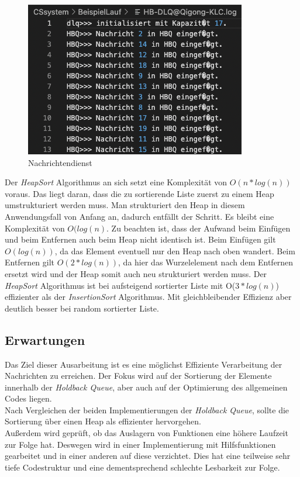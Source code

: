 \begin{figure}[htbp]
\begin{center}
\includegraphics[scale=0.6]{Bilder/HBQFilesEntry.png}
\caption{\label{fig:HBQFilesEntry2} Nachrichtendienst \cite{HBQlogging}} 
\end{center}
\end{figure}

Der \textit{HeapSort} Algorithmus an sich setzt eine Komplexität von $O(n*log(n))$ voraus. Das liegt daran, dass die zu sortierende Liste zuerst zu einem Heap umstrukturiert werden muss. Man strukturiert den Heap in diesem Anwendungsfall von Anfang an, dadurch entfällt der Schritt. Es bleibt eine Komplexität von $O(log(n)$. Zu beachten ist, dass der Aufwand beim Einfügen und beim Entfernen auch beim Heap nicht identisch ist. Beim Einfügen gilt $O(log(n))$, da das Element eventuell nur den Heap nach oben wandert. Beim Entfernen gilt $O(2*log(n))$, da hier das Wurzelelement nach dem Entfernen ersetzt wird und der Heap somit auch neu strukturiert werden muss. Der \textit{HeapSort} Algorithmus ist bei aufsteigend sortierter Liste mit O($3*log(n)$) effizienter als der \textit{InsertionSort} Algorithmus. Mit gleichbleibender Effizienz aber deutlich besser bei random sortierter Liste. 

\subsection{Erwartungen} \label{erwartungen}

Das Ziel dieser Ausarbeitung ist es eine möglichst Effiziente Verarbeitung der Nachrichten zu erreichen. Der Fokus wird auf der Sortierung der Elemente innerhalb der \textit{Holdback Queue}, aber auch auf der Optimierung des allgemeinen Codes liegen.\\
Nach Vergleichen der beiden Implementierungen der \textit{Holdback Queue}, sollte die Sortierung über einen Heap als effizienter hervorgehen.\\
Außerdem wird geprüft, ob das Auslagern von Funktionen eine höhere Laufzeit zur Folge hat. Deswegen wird in einer Implementierung mit Hilfsfunktionen gearbeitet und in einer anderen auf diese verzichtet. Dies hat eine teilweise sehr tiefe Codestruktur und eine dementsprechend schlechte Lesbarkeit zur Folge. 
